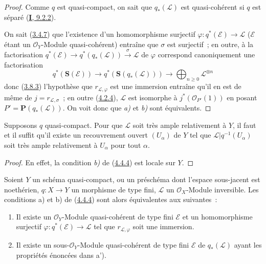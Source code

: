 \begin{proof}
Comme $q$ est quasi-compact, on sait que $q_*(\mathcal{L})$ est quasi-cohérent
si $q$ est séparé (\hyperref[I.9.2.2-fr]{\textbf{I}, 9.2.2}).


On sait (\hyperref[II.3.4.7-fr]{3.4.7}) que l'existence d'un homomorphisme
surjectif $\varphi:q^*(\mathcal{E})\to\mathcal{L}$ ($\mathcal{E}$ étant un
$\mathcal{O}_Y$-Module quasi-cohérent) entraîne que $\sigma$ est surjectif~;
en outre, à la factorisation
$q^*(\mathcal{E})\to q^*(q_*(\mathcal{L}))\xrightarrow{\sigma}\mathcal{L}$
de $\varphi$ correspond canoniquement une factorisation
\[
  q^*(\mathbf{S}(\mathcal{E}))
    \longrightarrow q^*(\mathbf{S}(q_*(\mathcal{L})))
    \longrightarrow\bigoplus_{n\geq0}\mathcal{L}^{\otimes n}
\]
donc (\hyperref[II.3.8.3-fr]{3.8.3}) l'hypothèse que
$r_{\mathcal{L},\varphi}$ est une immersion entraîne qu'il en est de même de
$j=r_{\mathcal{L},\sigma}$~; en outre
(\hyperref[II.4.2.4-fr]{4.2.4}), $\mathcal{L}$ est isomorphe à
$j^*(\mathcal{O}_{P'}(1))$ en posant
$P'=\mathbf{P}(q_*(\mathcal{L}))$. On voit donc que \emph{a)} et \emph{b)} sont
équivalents.
\end{proof}

\begin{corollary}[4.4.5]
\label{II.4.4.5-fr}
Supposons $q$ quasi-compact. Pour que $\mathcal{L}$ soit très ample
relativement à $Y$, il faut et il suffit qu'il existe un recouvrement ouvert
$(U_\alpha)$ de $Y$ tel que
$\mathcal{L}|q^{-1}(U_\alpha)$ soit très ample relativement à $U_\alpha$ pour
tout $\alpha$.
\end{corollary}

\begin{proof}
En effet, la condition \emph{b)} de (\hyperref[II.4.4.4-fr]{4.4.4}) est locale sur
$Y$.
\end{proof}

\begin{proposition}[4.4.6]
\label{II.4.4.6-fr}
Soient $Y$ un schéma quasi-compact, ou un préschéma dont l'espace sous-jacent
est noethérien, $q:X\to Y$ un morphisme \textup{de type fini}, $\mathcal{L}$ un
$\mathcal{O}_X$-Module inversible. Les conditions \textup{a)} et \textup{b)} de
\textup{(\hyperref[II.4.4.4-fr]{4.4.4})} sont alors équivalentes aux suivantes~:
\begin{enumerate}
  \item[\rm{a')}] Il existe un $\mathcal{O}_Y$-Module quasi-cohérent \textup{de type
  fini} $\mathcal{E}$ et un homomorphisme surjectif
  $\varphi:q^*(\mathcal{E})\to\mathcal{L}$ tel que
  $r_{\mathcal{L},\varphi}$ soit une immersion.
  \item[\rm{b')}] Il existe un sous-$\mathcal{O}_Y$-Module quasi-cohérent \textup{de type
  fini} $\mathcal{E}$ de $q_*(\mathcal{L})$ ayant les propriétés énoncées dans
  \textup{a')}.
\end{enumerate}
\end{proposition}

